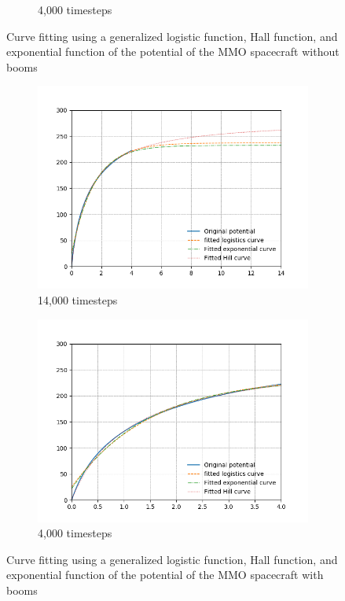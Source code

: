 \begin{center}
\begin{figure}[H]
\begin{subfigure}[b]{0.61\textwidth}
    \caption{4,000 timesteps}
    \label{fig:C_fit_NB_lim}
  \end{subfigure}
  \label{fig:Pot_noPH}
  \caption{Curve fitting using a generalized logistic function, Hall function, and exponential function of the potential of the MMO spacecraft without booms}
\end{figure}
\end{center}

\begin{center}
\begin{figure}[H]
  \begin{subfigure}[b]{0.61\textwidth}
    \includegraphics[width=\textwidth]{figures/Appendix/C_fit_WB.png}
    \caption{14,000 timesteps}
    \label{fig:C_fit_NB}
  \end{subfigure}
  \hfill
  \begin{subfigure}[b]{0.61\textwidth}
    \includegraphics[width=\textwidth]{figures/Appendix/C_fit_WB_lim.png}
    \caption{4,000 timesteps}
    \label{fig:C_fit_NB_lim}
  \end{subfigure}
  \label{fig:Pot_noPH}
  \caption{Curve fitting using a generalized logistic function, Hall function, and exponential function of the potential of the MMO spacecraft with booms}
\end{figure}
\end{center}


